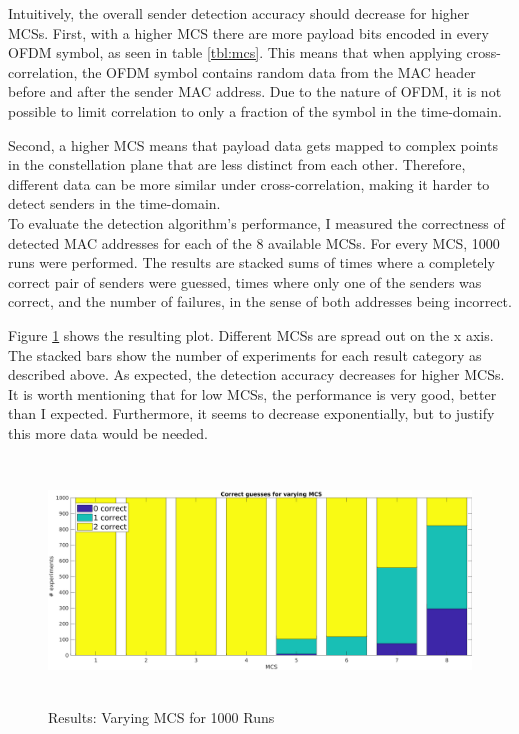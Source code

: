 Intuitively, the overall sender detection accuracy should decrease for higher \glspl{MCS}. First, with a higher \gls{MCS} there are more payload bits encoded in every \gls{OFDM} symbol, as seen in table \ref{tbl:mcs}. This means that when applying cross-correlation, the \gls{OFDM} symbol contains random data from the \gls{MAC} header before and after the sender \gls{MAC} address. Due to the nature of \gls{OFDM}, it is not possible to limit correlation to only a fraction of the symbol in the time-domain.

Second, a higher \gls{MCS} means that payload data gets mapped to complex points in the constellation plane that are less distinct from each other. Therefore, different data can be more similar under cross-correlation, making it harder to detect senders in the time-domain.\\

To evaluate the detection algorithm's performance, I measured the correctness of detected \gls{MAC} addresses for each of the 8 available \glspl{MCS}. For every \gls{MCS}, 1000 runs were performed. The results are stacked sums of times where a completely correct pair of senders were guessed, times where only one of the senders was correct, and the number of failures, in the sense of both addresses being incorrect.

Figure \ref{fig:vary_mcs} shows the resulting plot. Different \glspl{MCS} are spread out on the x axis. The stacked bars show the number of experiments for each result category as described above. As expected, the detection accuracy decreases for higher \glspl{MCS}. It is worth mentioning that for low \glspl{MCS}, the performance is very good, better than I expected. Furthermore, it seems to decrease exponentially, but to justify this more data would be needed.

\begin{figure}[H]
	\centering
	\includegraphics[height=6.5cm]{gfx/plots/mcs}
	\caption{Results: Varying MCS for 1000 Runs}
	\label{fig:vary_mcs}
\end{figure}



